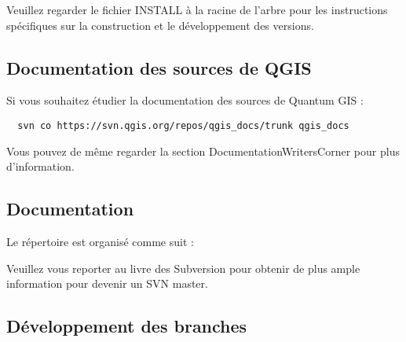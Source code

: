 Veuillez regarder le fichier INSTALL \`a la racine de l'arbre pour les instructions sp\'ecifiques sur la construction et le d\'eveloppement des versions.

\subsection{Documentation des sources de QGIS}

Si vous souhaitez \'etudier la documentation des sources de Quantum GIS :

\begin{verbatim}
  svn co https://svn.qgis.org/repos/qgis_docs/trunk qgis_docs
\end{verbatim}

Vous pouvez de m\^eme regarder la section \og{}DocumentationWritersCorner\fg{} pour plus d'information.

\subsection{Documentation}
Le r\'epertoire est organis\'e comme suit :


Veuillez vous reporter au livre des Subversion  pour obtenir de plus ample information pour devenir un SVN master.


\subsection{D\'eveloppement des branches}

